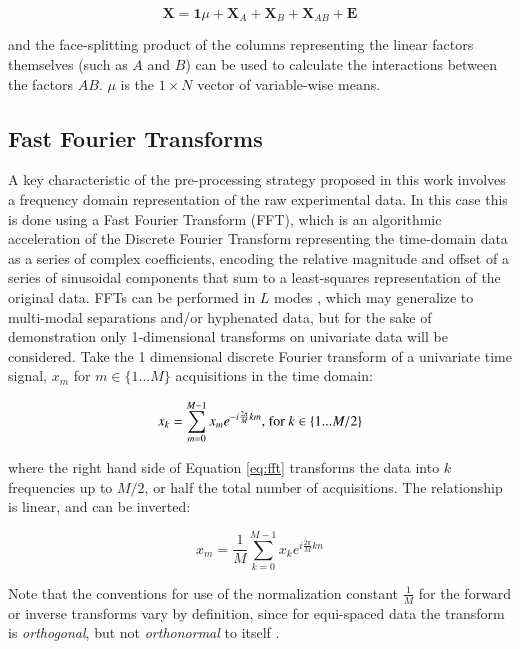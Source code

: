 \documentclass[preprint,12pt]{elsarticle}
\begin{document}
\begin{equation}
    \mathbf{X} = \mathbf{1}\mu + \mathbf{X}_A + \mathbf{X}_B + \mathbf{X}_{AB} + \mathbf{E}
\end{equation}

\noindent and the face-splitting product of the columns representing the linear factors themselves (such as $A$ and $B$) can be used to calculate the interactions between the factors $AB$. $\mu$ is the $1\times N$ vector of variable-wise means.

\subsection{Fast Fourier Transforms}

A key characteristic of the pre-processing strategy proposed in this work involves a frequency domain representation of the raw experimental data. In this case this is done using a Fast Fourier Transform (FFT), which is an algorithmic acceleration of the Discrete Fourier Transform representing the time-domain data as a series of complex coefficients, encoding the relative magnitude and offset of a series of sinusoidal components that sum to a least-squares representation of the original data. FFTs can be performed in $L$ modes \cite{smith1995handbook}, which may generalize to multi-modal separations and/or hyphenated data, but for the sake of demonstration only 1-dimensional transforms on univariate data will be considered. Take the 1 dimensional discrete Fourier transform of a univariate time signal, $x_m$ for $m \in \{1...M\}$ acquisitions in the time domain:

\begin{equation}\label{eq:fft}
    x_k = \sum_{m=0}^{M-1} x_m e^{-i \frac{2\pi}{M} km}\textnormal{, for } k \in \{1...M/2\}
\end{equation}

\noindent where the right hand side of Equation \ref{eq:fft} transforms the data into $k$ frequencies up to $M/2$, or half the total number of acquisitions. The relationship is linear, and can be inverted:

\begin{equation}\label{eq:ifft}
    x_m = \frac{1}{M} \sum_{k=0}^{M-1} x_k e^{i \frac{2\pi}{M} kn}
\end{equation}

Note that the conventions for use of the normalization constant $\frac{1}{M}$ for the forward or inverse transforms vary by definition, since for equi-spaced data the transform is \textit{orthogonal}, but not \textit{orthonormal} to itself \cite{armstrong2023direct}.
\end{document}
